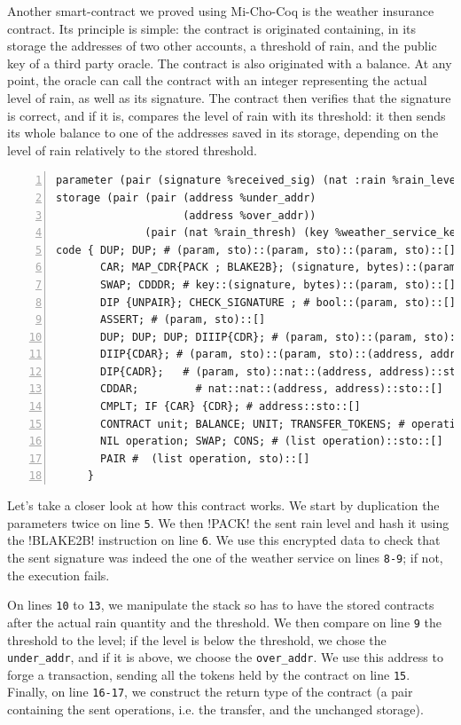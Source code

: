 \documentclass{report}
\begin{document}
Another smart-contract we proved using Mi-Cho-Coq is the weather insurance contract. Its principle is simple: the contract is originated containing, in its storage the addresses of two other accounts, a threshold of rain, and the public key of a third party oracle. The contract is also originated with a balance. At any point, the oracle can call the contract with an integer representing the actual level of rain, as well as its signature. The contract then verifies that the signature is correct, and if it is, compares the level of rain with its threshold: it then sends its whole balance to one of the addresses saved in its storage, depending on the level of rain relatively to the stored threshold.


\begin{lstlisting}[language=michelson,numbers=left]
parameter (pair (signature %received_sig) (nat :rain %rain_level));
storage (pair (pair (address %under_addr)
                    (address %over_addr))
              (pair (nat %rain_thresh) (key %weather_service_key)));
code { DUP; DUP; # (param, sto)::(param, sto)::(param, sto)::[]
       CAR; MAP_CDR{PACK ; BLAKE2B}; (signature, bytes)::(param, sto)::(param, sto)::[] 
       SWAP; CDDDR; # key::(signature, bytes)::(param, sto)::[]
       DIP {UNPAIR}; CHECK_SIGNATURE ; # bool::(param, sto)::[]
       ASSERT; # (param, sto)::[]
       DUP; DUP; DUP; DIIIP{CDR}; # (param, sto)::(param, sto)::(param, sto)::sto::[]
       DIIP{CDAR}; # (param, sto)::(param, sto)::(address, address)::sto::[]
       DIP{CADR};   # (param, sto)::nat::(address, address)::sto::[]
       CDDAR;         # nat::nat::(address, address)::sto::[]
       CMPLT; IF {CAR} {CDR}; # address::sto::[]
       CONTRACT unit; BALANCE; UNIT; TRANSFER_TOKENS; # operation::sto::[]
       NIL operation; SWAP; CONS; # (list operation)::sto::[]
       PAIR #  (list operation, sto)::[]
     }
\end{lstlisting}

Let's take a closer look at how this contract works. We start by duplication the parameters twice on line \texttt{5}. We then !PACK! the sent rain level and hash it using the !BLAKE2B! instruction on line \texttt{6}. We use this encrypted data to check that the sent signature was indeed the one of the weather service on lines \texttt{8-9}; if not, the execution fails.

On lines \texttt{10} to \texttt{13}, we manipulate the stack so has to have the stored contracts after the actual rain quantity and the threshold. We then compare on line \texttt{9} the threshold to the level; if the level is below the threshold, we chose the \texttt{under\_addr}, and if it is above, we choose the \texttt{over\_addr}. We use this address to forge a transaction, sending all the tokens held by the contract on line \texttt{15}. Finally, on line \texttt{16-17}, we construct the return type of the contract (a pair containing the sent operations, i.e. the transfer, and the unchanged storage).\\
\end{document}
